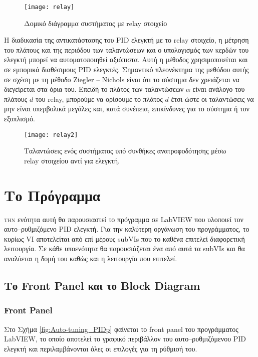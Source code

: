 \begin{figure}[h]
  \centering
  \texttt{[image: relay]}
  \caption{Δομικό διάγραμμα συστήματος με relay στοιχείο}
  \label{fig:relay}
\end{figure}



Η διαδικασία της αντικατάστασης του PID ελεγκτή με το relay στοιχείο, η μέτρηση του πλάτους και της περιόδου των ταλαντώσεων και ο υπολογισμός των κερδών του ελεγκτή μπορεί να αυτοματοποιηθεί αξιόπιστα. Αυτή η μέθοδος χρησιμοποιείται και σε εμπορικά διαθέσιμους PID ελεγκτές. Σημαντικό πλεονέκτημα της μεθόδου αυτής σε σχέση με τη μέθοδο Ziegler -- Nichols είναι ότι το σύστημα δεν χρειάζεται να διεγείρεται στα όρια του. Επειδή το πλάτος των ταλαντώσεων $\alpha$ είναι ανάλογο του πλάτους $d$ του relay, μπορούμε να ορίσουμε το πλάτος $d$ έτσι ώστε οι ταλαντώσεις να μην είναι υπερβολικά μεγάλες και, κατά συνέπεια, επικίνδυνες για το σύστημα ή τον εξοπλισμό.

\begin{figure}[H]
  \centering
  \texttt{[image: relay2]}
  \caption{Ταλαντώσεις ενός συστήματος υπό συνθήκες ανατροφοδότησης μέσω relay στοιχείου αντί για ελεγκτή.}
  \label{fig:relay2}
\end{figure}

\section{Το Πρόγραμμα}

\lettrine[findent=2pt]{}{την} ενότητα αυτή θα παρουσιαστεί το πρόγραμμα σε LabVIEW που υλοποιεί τον αυτο--ρυθμιζόμενο PID ελεγκτή. Για την καλύτερη οργάνωση του προγράμματος, το κυρίως VI αποτελείται από επί μέρους subVIs που το καθένα επιτελεί διαφορετική λειτουργία. Σε κάθε υποενότητα θα παρουσιάζεται ένα από αυτά τα subVIs και θα αναλύεται η δομή του καθώς και η λειτουργία που επιτελεί.

\subsection{Το Front Panel και το Block Diagram}

\subsubsection{Front Panel}

Στο Σχήμα \ref{fig:Auto-tuning_PIDp} φαίνεται το front panel του προγράμματος LabVIEW, το οποίο αποτελεί το γραφικό περιβάλλον του αυτο--ρυθμιζόμενου PID ελεγκτή και περιλαμβάνονται όλες οι επιλογές για τη ρύθμισή του.  

